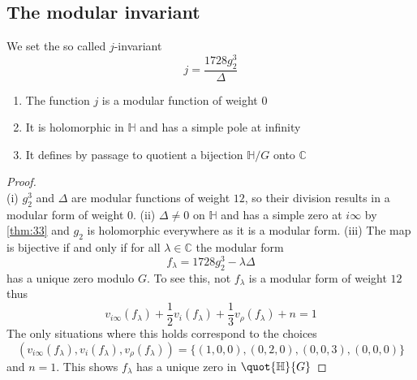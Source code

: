\documentclass[12pt]{article}
\theoremstyle{definition}
\begin{document}
\subsection{The modular invariant}
We set the so called \(j\)-invariant
\[
    j=\frac{1728g_2^3}{\Delta}
\]
\begin{prop}[label=35]
\begin{enumerate}
    \item The function \(j\) is a modular function of weight \(0\)
    \item It is holomorphic in \(\mathbb{H}\) and has a simple pole at infinity
    \item It defines by passage to quotient a bijection \(\mathbb{H}/G\) onto \(\mathbb{C} \)   
\end{enumerate}
\end{prop}
\begin{proof}~\\
(i) \(g_2^3\) and \(\Delta \) are modular functions of weight \(12\), so their division results in a modular form of weight \(0\).\newline    
(ii) \(\Delta \ne 0\) on \(\mathbb{H} \) and has a simple zero at \(i\infty \) by \cref{thm:33} and \(g_2\) is holomorphic everywhere as it is a modular form.\newline
(iii) The map is bijective if and only if for all \(\lambda \in \mathbb{C} \) the modular form 
\[
    f_\lambda =1728g_2^{3}-\lambda \Delta  
\]     
has a unique zero modulo \(G\). To see this, not \(f_\lambda \) is a modular form of weight \(12\) thus 
\[
    v_{i\infty }(f_\lambda ) + \frac{1}{2}v_i(f_\lambda ) +\frac{1}{3}v_\rho (f_\lambda )+n = 1
\]  
The only situations where this holds correspond to the choices
\[
    (v_{i\infty } (f_\lambda ),v_i(f_\lambda ),v_\rho (f_\lambda ))=\{ (1,0,0),(0,2,0),(0,0,3),(0,0,0) \} 
\]
and \(n=1\). This shows \(f_\lambda \) has a unique zero in \(\quot{\mathbb{H} }{G} \)  
\end{proof}
\end{document}
